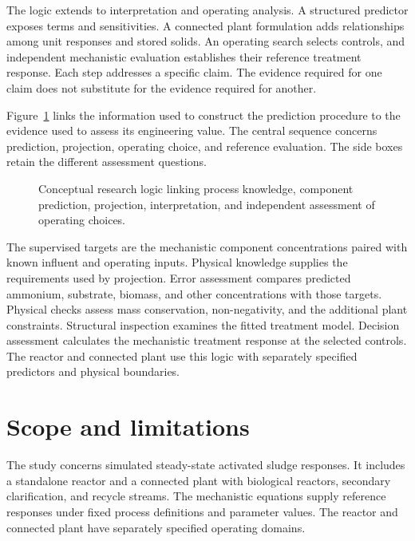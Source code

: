 The logic extends to interpretation and operating analysis. A structured predictor exposes terms and sensitivities. A connected plant formulation adds relationships among unit responses and stored solids. An operating search selects controls, and independent mechanistic evaluation establishes their reference treatment response. Each step addresses a specific claim. The evidence required for one claim does not substitute for the evidence required for another.

Figure~\ref{fig:research_conceptual_logic} links the information used to construct the prediction procedure to the evidence used to assess its engineering value. The central sequence concerns prediction, projection, operating choice, and reference evaluation. The side boxes retain the different assessment questions.

\begin{figure}[htbp]
\centering

\caption{Conceptual research logic linking process knowledge, component prediction, projection, interpretation, and independent assessment of operating choices.}
\label{fig:research_conceptual_logic}
\end{figure}

The supervised targets are the mechanistic component concentrations paired with known influent and operating inputs. Physical knowledge supplies the requirements used by projection. Error assessment compares predicted ammonium, substrate, biomass, and other concentrations with those targets. Physical checks assess mass conservation, non-negativity, and the additional plant constraints. Structural inspection examines the fitted treatment model. Decision assessment calculates the mechanistic treatment response at the selected controls. The reactor and connected plant use this logic with separately specified predictors and physical boundaries.

\section{Scope and limitations}

The study concerns simulated steady-state activated sludge responses. It includes a standalone reactor and a connected plant with biological reactors, secondary clarification, and recycle streams. The mechanistic equations supply reference responses under fixed process definitions and parameter values. The reactor and connected plant have separately specified operating domains.

